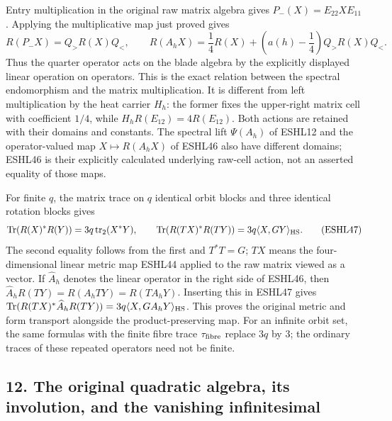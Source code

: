 \documentclass[
  10pt,
  a4paper,
]{article}
\begin{document}
Entry multiplication in the original raw matrix algebra gives
\(P_-(X)=E_{22}XE_{11}\). Applying the multiplicative map just proved
gives \[
R(P_-X)=Q_>R(X)Q_<,
\qquad
R(A_hX)=\frac14R(X)+\left(a(h)-\frac14\right)Q_>R(X)Q_<.
\tag{ESHL46}
\] Thus the quarter operator acts on the blade algebra by the explicitly
displayed linear operation on operators. This is the exact relation
between the spectral endomorphism and the matrix multiplication. It is
different from left multiplication by the heat carrier \(H_h\): the
former fixes the upper-right matrix cell with coefficient \(1/4\), while
\(H_hR(E_{12})=4R(E_{12})\). Both actions are retained with their
domains and constants. The spectral lift \(\Psi(A_h)\) of ESHL12 and the
operator-valued map \(X\mapsto R(A_hX)\) of ESHL46 also have different
domains; ESHL46 is their explicitly calculated underlying raw-cell
action, not an asserted equality of those maps.

For finite \(q\), the matrix trace on \(q\) identical orbit blocks and
three identical rotation blocks gives \[
\operatorname{Tr}(R(X)^*R(Y))=3q\operatorname{tr}_2(X^*Y),
\qquad
\operatorname{Tr}(R(TX)^*R(TY))=3q\langle X,GY\rangle_{\rm HS}.
\tag{ESHL47}
\] The second equality follows from the first and \(T^*T=G\); \(TX\)
means the four-dimensional linear metric map ESHL44 applied to the raw
matrix viewed as a vector. If \(\widehat A_h\) denotes the linear
operator in the right side of ESHL46, then
\(\widehat A_hR(TY)=R(A_hTY)=R(TA_hY)\). Inserting this in ESHL47 gives
\(\operatorname{Tr}(R(TX)^*\widehat A_hR(TY))=3q\langle X,GA_hY\rangle_{\rm HS}\).
This proves the original metric and form transport alongside the
product-preserving map. For an infinite orbit set, the same formulas
with the finite fibre trace \(\tau_{\rm fibre}\) replace \(3q\) by
\(3\); the ordinary traces of these repeated operators need not be
finite.

\subsection{12. The original quadratic algebra, its involution, and the
vanishing
infinitesimal}\label{the-original-quadratic-algebra-its-involution-and-the-vanishing-infinitesimal}
\end{document}
